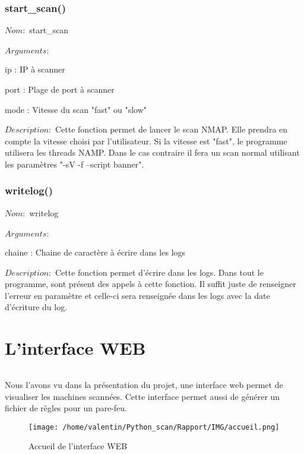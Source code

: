 \documentclass[12pt]{report}
\begin{document}
		\section{start\_scan()}
			{\setlength{\parindent}{0cm}
			$Nom :$ start\_scan\\\\
			}
			$Arguments :$
			\begin{description}
				\item ip : IP à scanner
				\item port : Plage de port à scanner
				\item mode : Vitesse du scan "fast" ou "slow"\\
			\end{description}
			$Description : $ Cette fonction permet de lancer le scan NMAP. Elle prendra en compte la vitesse choisi par l'utilisateur. Si la vitesse est "fast", le programme utilisera les threads NAMP. Dans le cas contraire il fera un scan normal utilisant les paramètres "-sV -f --script banner".
		\section{writelog()}
			{\setlength{\parindent}{0cm}
			$Nom :$ writelog\\\\
			}
			$Arguments :$
			\begin{description}
				\item chaine : Chaine de caractère à écrire dans les logs\\
			\end{description}
			$Description : $ Cette fonction permet d'écrire dans les logs. Dans tout le programme, sont présent des appels à cette fonction. Il suffit juste de renseigner l'erreur en paramètre et celle-ci sera renseignée dans les logs avec la date d'écriture du log.
\part{L'interface WEB}
	\paragraph{}
		Nous l'avons vu dans la présentation du projet, une interface web permet de visualiser les machines scannées. Cette interface permet aussi de générer un fichier de règles pour un pare-feu.
		\begin{figure}[ht]
			\begin{center}\texttt{[image: /home/valentin/Python\_scan/Rapport/IMG/accueil.png]}
			\caption{\label{accueil} Accueil de l'interface WEB}\end{center}
		\end{figure}
\end{document}
